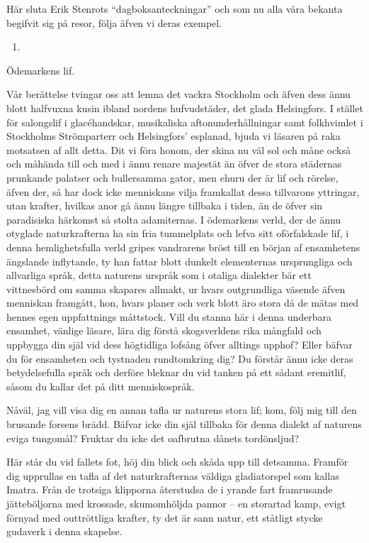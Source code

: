 Här sluta Erik Stenrots ``dagboksanteckningar'' och som nu alla våra
bekanta begifvit sig på resor, följa äfven vi deras exempel.

\begin{enumerate}
\def\labelenumi{\arabic{enumi}.}
\setcounter{enumi}{7}
\tightlist
\item
\end{enumerate}

Ödemarkens lif.

Vår berättelse tvingar oss att lemna det vackra Stockholm och äfven dess
ännu blott halfvuxna kusin ibland nordens hufvudstäder, det glada
Helsingfors. I stället för salongslif i glacéhandskar, musikaliska
aftonunderhållningar samt folkhvimlet i Stockholms Strömparterr och
Helsingfors' esplanad, bjuda vi läsaren på raka motsatsen af allt detta.
Dit vi föra honom, der skina nu väl sol och måne också och måhända till
och med i ännu renare majestät än öfver de stora städernas prunkande
palatser och bullersamma gator, men ehuru der är lif och rörelse, äfven
der, så har dock icke menniskans vilja framkallat dessa tillvarons
yttringar, utan krafter, hvilkas anor gå ännu längre tillbaka i tiden,
än de öfver sin paradisiska härkomst så stolta adamiternas. I ödemarkens
verld, der de ännu otyglade naturkrafterna ha sin fria tummelplats och
lefva sitt oförfalskade lif, i denna hemlighetsfulla verld gripes
vandrarens bröst till en början af ensamhetens ängslande inflytande, ty
han fattar blott dunkelt elementernas ursprungliga och allvarliga språk,
detta naturens urspråk som i otaliga dialekter bär ett vittnesbörd om
samma skapares allmakt, ur hvars outgrundliga väsende äfven menniskan
framgått, hon, hvars planer och verk blott äro stora då de mätas med
hennes egen uppfattnings måttstock. Vill du stanna här i denna underbara
ensamhet, vänlige läsare, lära dig förstå skogsverldens rika mångfald
och uppbygga din själ vid dess högtidliga lofsång öfver alltings upphof?
Eller bäfvar du för ensamheten och tystnaden rundtomkring dig? Du
förstår ännu icke deras betydelsefulla språk och derföre bleknar du vid
tanken på ett sådant eremitlif, såsom du kallar det på ditt
menniskospråk.

Nåväl, jag vill visa dig en annan tafla ur naturens stora lif; kom, följ
mig till den brusande forsens brädd. Bäfvar icke din själ tillbaka för
denna dialekt af naturens eviga tungomål? Fruktar du icke det oafbrutna
dånets tordönsljud?

Här står du vid fallets fot, höj din blick och skåda upp till detsamma.
Framför dig upprullas en tafla af det naturkrafternas väldiga
gladiatorspel som kallas Imatra. Från de trotsiga klipporna återstudsa
de i yrande fart framrusande jätteböljorna med krossade, skumomhöljda
pannor -- en storartad kamp, evigt förnyad med outtröttliga krafter, ty
det är sann natur, ett ståtligt stycke gudaverk i denna skapelse.

